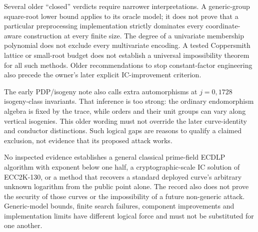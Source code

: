 Several older ``closed'' verdicts require narrower interpretations.
A generic-group square-root lower bound applies to its oracle model;
it does not prove that a particular preprocessing implementation strictly
dominates every coordinate-aware construction at every finite size.
The degree of a univariate membership polynomial does not exclude every
multivariate encoding. A tested Coppersmith lattice or small-root budget
does not establish a universal impossibility theorem for all such
methods. Older recommendations to stop constant-factor engineering also
precede the owner's later explicit IC-improvement criterion.

The early PDP/isogeny note also calls extra automorphisms at $j=0,1728$
isogeny-class invariants. That inference is too strong: the ordinary
endomorphism algebra is fixed by the trace, while orders and their unit
groups can vary along vertical isogenies. This older wording must not
override the later curve-identity and conductor distinctions. Such
logical gaps are reasons to qualify a claimed exclusion, not evidence
that its proposed attack works.

No inspected evidence establishes a general classical prime-field
ECDLP algorithm with exponent below one half, a cryptographic-scale IC
solution of ECC2K-130, or a method that recovers a standard deployed
curve's arbitrary unknown logarithm from the public point alone. The
record also does not prove the security of those curves or the
impossibility of a future non-generic attack. Generic-model bounds,
finite search failures, component improvements and implementation
limits have different logical force and must not be substituted for
one another.
